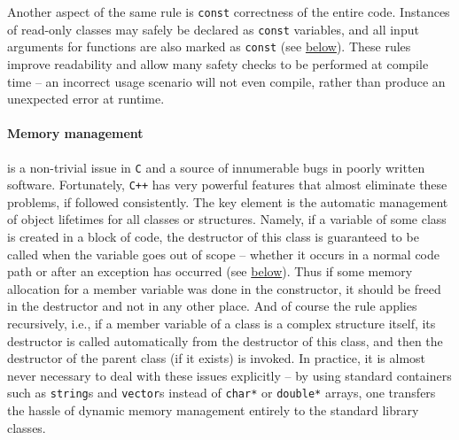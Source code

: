 \documentclass[12pt]{article}
\newcommand{\Cpp}  {\texttt{C++}\xspace}
\let\oldparagraph\paragraph
\renewcommand{\paragraph}[1]{\vspace{-2mm}\oldparagraph{#1}}
\begin{document}
Another aspect of the same rule is \texttt{const} correctness of the entire code. Instances of read-only classes may safely be declared as \texttt{const} variables, and all input arguments for functions are also marked as \texttt{const} (see \hyperref[sec:CallingConventions]{below}).
These rules improve readability and allow many safety checks to be performed at compile time -- an incorrect usage scenario will not even compile, rather than produce an unexpected error at runtime.

\paragraph{Memory management}  is a non-trivial issue in \texttt{C} and a source of innumerable bugs in poorly written software. Fortunately, \Cpp has very powerful features that almost eliminate these problems, if followed consistently. The key element is the automatic management of object lifetimes for all classes or structures. Namely, if a variable of some class is created in a block of code, the destructor of this class is guaranteed to be called when the variable goes out of scope -- whether it occurs in a normal code path or after an exception has occurred (see \hyperref[sec:Exceptions]{below}). Thus if some memory allocation for a member variable was done in the constructor, it should be freed in the destructor and not in any other place. And of course the rule applies recursively, i.e., if a member variable of a class is a complex structure itself, its destructor is called automatically from the destructor of this class, and then the destructor of the parent class (if it exists) is invoked. In practice, it is almost never necessary to deal with these issues explicitly -- by using standard containers such as \texttt{string}s and \texttt{vector}s instead of \texttt{char*} or \texttt{double*} arrays, one transfers the hassle of dynamic memory management entirely to the standard library classes.
\end{document}
